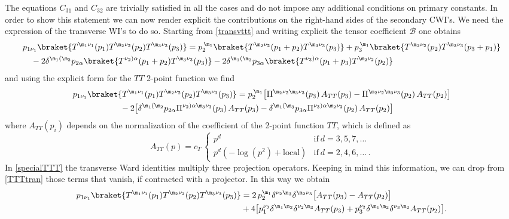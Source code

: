 \documentclass[a4paper,11pt,openright,twoside]{book}
\let\a=\alpha   \let\b=\beta   \let\g=\gamma   \let\d=\delta
\let\n=\nu      \let\x=\xi     \let\p=\pi      \let\r=\rho
\numberwithin{equation}{section}
\begin{document}
{{{The equations $C_{31}$ and $C_{32}$ are trivially satisfied in all the cases and do not impose any additional conditions on primary constants. In order to show this statement we can now render explicit the contributions on the right-hand sides of the secondary CWI's. We need the expression of the transverse WI's to do so. Starting from \eqref{transvttt} and writing explicit the tensor coefficient $\mathcal{B}$ one obtains 
\begin{align}
	&p_{1\n_1}\braket{T^{\m_1\n_1}(p_1)T^{\m_2\n_2}(p_2)T^{\m_3\n_3}(p_3)}=p_2^{\,\m_1}\braket{T^{\m_2\n_2}(p_1+p_2)T^{\m_3\n_3}(p_3)}+p_3^{\,\m_1}\braket{T^{\m_2\n_2}(p_2)T^{\m_3\n_3}(p_3+p_1)}\notag\\
	&\quad-2\d^{\m_1(\m_2}p_{2\a}\braket{T^{\n_2)\a}(p_1+p_2)T^{\m_3\n_3}(p_3)}-2\d^{\m_1(\m_3}p_{3\a}\braket{T^{\n_3)\a}(p_1+p_3)T^{\m_2\n_2}(p_2)}
\end{align}
and using the explicit form for the $TT$ 2-point function we find
\begin{align}
	&p_{1\n_1}\braket{T^{\m_1\n_1}(p_1)T^{\m_2\n_2}(p_2)T^{\m_3\n_3}(p_3)}=p_2^{\,\m_1}\big[\Pi^{\m_2\n_2\m_3\n_3}(p_3)\,A_{TT}(p_3)-\Pi^{\m_2\n_2\m_3\n_3}(p_2)\,A_{TT}(p_2)\big]\notag\\
	&\hspace{2cm}-2\big[\d^{\m_1(\m_2}p_{2\a}\Pi^{\n_2)\a\m_3\n_3}(p_3)\,A_{TT}(p_3)-\d^{\m_1(\m_3}p_{3\a}\Pi^{\n_3)\a\m_2\n_2}(p_2)\,A_{TT}(p_2)\big]\label{TTTtran}
\end{align}
where $A_{TT}(p_i)$ depends on the normalization of the coefficient of the 2-point function $TT$, which is defined as
\begin{equation}
	A_{TT}(p)=c_T\,\begin{cases}
		p^d&\text{if}\ d=3,5,7,\dots\\
		p^d(-\log(p^2)+\text{local})&\text{if}\ d=2,4,6,\dots\,.
	\end{cases}\label{ATT}
\end{equation}
In \eqref{specialTTT} the transverse Ward identities multiply three projection operators. Keeping in mind this information, we can drop from \eqref{TTTtran} those terms that vanish, if contracted with a projector. In this way we obtain
\begin{align}
	p_{1\n_1}\braket{T^{\m_1\n_1}(p_1)T^{\m_2\n_2}(p_2)T^{\m_3\n_3}(p_3)}&=2\,p_2^{\m_1}\d^{\n_2\m_3}\d^{\m_2\n_3}\big[A_{TT}(p_3)-A_{TT}(p_2)\big]\notag\\
	&+4\big[p_1^{\n_3}\d^{\m_1\m_2}\d^{\n_2\m_3}A_{TT}(p_3)+p_3^{\n_2}\d^{\m_1\m_3}\d^{\n_3\m_2}A_{TT}(p_2)\big].

\end{align}}}}
\end{document}
